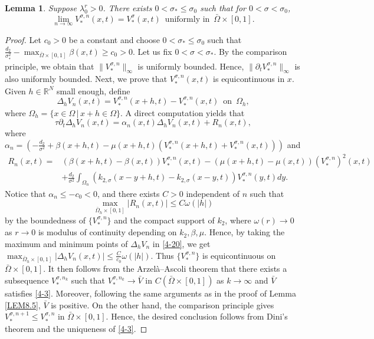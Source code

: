 \documentclass[11pt,reqno]{amsart}
\newtheorem{lemma}[theorem]{Lemma}
\numberwithin{equation}{section}
\begin{document}
\begin{lemma}\label{LEM8.8}
Suppose $\lambda_{0}^{r}>0$.
There exists $0< \sigma_{*} \leq \sigma_{0}$ such that for $0<\sigma < \sigma_{0}$,
\begin{equation*}
\lim_{n\to\infty} V_{*}^{\sigma,n}(x,t) = V^{\sigma}_{*}(x,t) \enspace \text{uniformly in}\enspace \bar{\Omega}\times [0,1].
\end{equation*}
\end{lemma}
\begin{proof}
Let $c_{0}>0$ be a constant and choose $0< \sigma_{*} \leq \sigma_{0}$ such that $\frac{d_{2}}{\sigma^{2}_{*}} - \max_{\bar{\Omega}\times [0,1]}\beta(x,t) \geq c_{0} > 0$.
Let us fix $0< \sigma < \sigma_{*}$.
By the comparison principle, we obtain that $\| V_{*}^{\sigma,n} \|_{\infty}$ is uniformly bounded. Hence, $\| \partial_{t}V_{*}^{\sigma,n} \|_{\infty}$ is also uniformly bounded. Next, we prove that $V_{*}^{\sigma,n}(x,t)$ is equicontinuous in $x$.
Given $h\in\mathbb{R}^{N}$ small enough,
define
\begin{equation*}
\Delta_{h} V_{n}(x,t) = V_{*}^{\sigma,n}(x+h,t) - V_{*}^{\sigma,n}(x,t)
\enspace \text{on} \enspace \Omega_{h},
\end{equation*}
where $\Omega_{h} = \{ x\in \Omega \,|\, x+h\in\Omega \}$.
A direct computation yields that
\begin{equation}\label{4-20}
\tau \partial_{t} \Delta_{h} V_{n}(x,t) = \alpha_{n}(x,t)\Delta_{h} V_{n}(x,t) + R_{n}(x,t),
\end{equation}
where $\alpha_{n} = \left( -\frac{d_{2}}{\sigma^{2}} + \beta(x+h,t) - \mu(x+h,t)(V_{*}^{\sigma,n}(x+h,t) + V_{*}^{\sigma,n}(x,t) )  \right)$ and
\begin{align*}
R_{n}(x,t) =&(\beta(x+h,t)-\beta(x,t))V_{*}^{\sigma,n}(x,t) - (\mu(x+h,t)-\mu(x,t))(V_{*}^{\sigma,n})^{2}(x,t)\\
&+\frac{d_{2}}{\sigma^{2}} \int_{\Omega_{n}} \left( k_{2,\sigma}\left (x-y+h,t \right) - k_{2,\sigma}(x-y,t)  \right)V_{*}^{\sigma,n}(y,t)dy.
\end{align*}
Notice that $\alpha_{n} \leq -c_{0} < 0$, and there exists $C>0$ independent of $n$ such that
$$\max_{ \bar{\Omega}_{h} \times [0,1]}  |R_{n}(x,t)| \leq C\omega(|h|)$$ by the boundedness of $\{V_{*}^{\sigma,n} \}$ and the compact support of $k_{2}$, where $\omega(r) \to 0$ as $r\to0$ is modulus of continuity depending on $k_{2},\beta,\mu$.
Hence, by taking the maximum and minimum points of $\Delta_{h} V_{n}$ in \ref{4-20}, we get
$\max_{ \bar{\Omega}_{h} \times [0,1]} |\Delta_{h} V_{n}(x,t) | \leq \frac{C}{c_{0}}\omega(|h|)$. Thus $\{ V_{*}^{\sigma,n} \}$ is equicontinuous on $\bar{\Omega} \times [0,1]$. It then follows from the Arzel\`a--Ascoli theorem that there exists a subsequence $V_{*}^{\sigma,n_{k}}$ such that $V_{*}^{\sigma,n_{k}} \to \bar{V}$ in $C(\bar{\Omega}\times[0,1])$ as $k\to\infty$ and $\bar{V}$ satisfies \eqref{4-3}. Moreover, following the same arguments as in the proof of Lemma \ref{LEM8.5},  $\bar{V}$ is positive. On the other hand, the comparison principle gives $V_{*}^{\sigma,n+1} \leq V_{*}^{\sigma,n}$ in $\bar{\Omega}\times[0,1]$. Hence, the desired conclusion follows from Dini's theorem and the uniqueness of \eqref{4-3}.
\end{proof}
\end{document}
